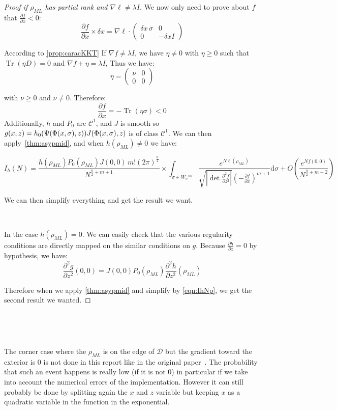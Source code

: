 \documentclass[10pt,a4paper]{report}
\theoremstyle{plain}
\theoremstyle{definition}
\theoremstyle{remark}
\newcommand{\dd}{\mathrm{d}}
\newcommand{\dpar}[2]{\frac{\partial{#1}}{\partial{#2}}}
\newcommand{\dparn}[3]{\frac{\partial^{#3} {#1}}{\partial{#2}^{#3}}}
\renewcommand{\geq}{\geqslant}
\newcommand{\mat}[1]{\begin{pmatrix}#1\end{pmatrix}}
\DeclareMathOperator{\Tr}{Tr}
\newcommand{\class}[1]{{\mathscr{C}^{#1}}}
\newcommand{\ml}{_{M\!L}}
\begin{document}
\begin{proof}[Proof if $\rho\ml$ has partial rank and $\nabla \ell \neq \lambda I$]
  We now only need to prove about $f$ that $\dpar f x < 0$:
  \[\dpar f x \times \delta x = \nabla \ell \cdot \mat{\delta x\, \sigma & 0\\0 &-
      \delta x I} \]

  According to \cref{prop:caracKKT} If $\nabla f \neq \lambda I$, we have $\eta
  \neq 0$ with $\eta \geq 0$ such that $\Tr(\eta D) = 0$ and $\nabla f + \eta =
  \lambda I$, Thus we have:
  \begin{equation}\label{eqn:etanu}
  \eta = \mat{\nu&0\\0&0}
  \end{equation}

  with $\nu \geq 0$ and $\nu \neq 0$. Therefore:
  \[\dpar f x = - \Tr(\eta\sigma) <0\]
  Additionally, $h$ and $P_0$ are $\class 1$, and $J$ is smooth so $g(x,z) =
  h_0(\Psi(\Phi(x,\sigma),z))J(\Phi(x,\sigma),z)$ is of class $\class 1$. We can then
  apply~\cref{thm:asypmid}, and when $h(\rho\ml) \neq 0$ we have:

  \begin{equation}\label{eqn:IhNp}
    I_h(N) =
    \frac{h(\rho\ml)P_0(\rho\ml)J(0,0)\,m! {(2\pi)}^{\frac n 2}}{N^{\frac n 2 + m + 1}} \times
    \int_{\sigma \in W_\sigma''''}\frac{e^{N\ell(\rho\ml)}}
    {\sqrt{\left|\det \dparn f z 2\right|} \left(-\dpar f x\right)^{m+1}} \dd \sigma
    + O\left(\frac{e^{Nf(0,0)}}{N^{\frac n 2 + m + 2}}\right)
  \end{equation}

  We can then simplify everything and get the result we want.

  \

  In the case $h(\rho\ml) = 0$. We can easily check that the various regularity conditions
  are directly mapped on the similar conditions on $g$. Because $\dpar h z = 0$
  by hypothesis, we have:
  \[\dparn g z 2(0,0) = J(0,0)P_0(\rho\ml) \dparn h z 2 (\rho\ml)\]

  Therefore when we apply \cref{thm:asypmid} and simplify by \cref{eqn:IhNp},
  we get the second result we wanted.
\end{proof}


\

\

The corner case where the $\rho\ml$ is on the edge of $\mathcal{D}$ but the
gradient toward the exterior is 0 is not done in this report like in the original
paper~\cite{SPRAL17}. The probability that such an event happens is really low
(if it is not 0) in particular if we take into account the numerical errors of
the implementation. However it can still probably be done by splitting again the
$x$ and $z$ variable but keeping $x$ as a quadratic variable in the function in
the exponential.
\end{document}
